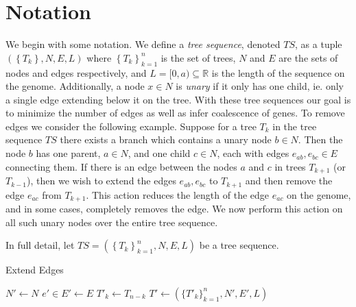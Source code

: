 \documentclass{article}
\newcommand{\R}{\mathbb{R}}
\begin{document}
\section{Notation}
    We begin with some notation. We define a \textit{tree sequence}, denoted $TS$, 
    as a tuple $\left( \left\{T_k\right\}, N, E, L\right)$ where
     $\left\{T_k\right\}_{k=1}^n$ is the set of trees,
     $N$ and $E$ are the sets of nodes and edges respectively,
     and $L=[0,a)\subseteq \R$ is the length of the sequence on the genome. 
    Additionally, a node $x\in N$ is \textit{unary} if it only has one child, 
    ie. only a single edge extending below it on the tree.
    With these tree sequences our goal is to
    minimize the number of edges
    as well as infer coalescence of genes. 
    To remove edges we consider the following example.
    Suppose for a tree $T_k$ in the tree sequence $TS$ 
    there exists a branch which contains a unary node $b\in N$.
    Then the node $b$ has one parent, $a\in N$, 
    and one child $c\in N$,
    each with edges $e_{ab}, e_{bc}\in E$ connecting them.
    If there is an edge between the nodes $a$ and $c$ in trees 
    $T_{k+1}$ (or $T_{k-1}$),
    then we wish to extend the edges $e_{ab},e_{bc}$ 
    to $T_{k+1}$ and then remove the edge $e_{ac}$ from $T_{k+1}$. 
    This action reduces the length of the edge $e_{ac}$ on the genome,
    and in some cases, completely removes the edge. 
    We now perform this action on all such unary nodes 
    over the entire tree sequence.


    In full detail, let $TS = \left( \left\{T_k\right\}_{k=1}^n, N, E, L\right)$
    be a tree sequence.


\begin{algorithm}  %
\caption{Extend Edges}\label{alg:cap}
\begin{algorithmic}
\State   $ N' \gets N$
\State   $ e'\in E' \gets E $
\State   $ T'_k \gets T_{n-k} $
\State   $ T' \gets (\{T'_k\}_{k=1}^n,N',E',L) $ 
\end{algorithmic}
\end{algorithm}
\end{document}
